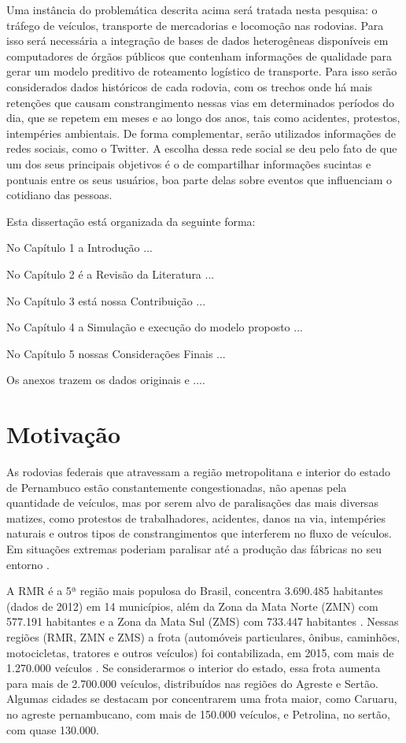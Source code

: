 Uma instância do problemática descrita acima será tratada nesta pesquisa: o tráfego de veículos, transporte de mercadorias e locomoção nas rodovias.  Para isso será necessária a integração de bases de dados heterogêneas disponíveis em computadores de órgãos públicos 
que contenham informações de qualidade para gerar um modelo preditivo de roteamento logístico de transporte. Para isso serão considerados dados históricos de cada rodovia, com os trechos onde há mais 
retenções que causam constrangimento nessas vias em determinados períodos do dia, que se repetem em meses e ao longo dos anos, tais como acidentes, protestos, intempéries ambientais.
De forma complementar, serão utilizados informações de redes sociais, como o Twitter. A escolha dessa rede social se deu pelo fato de que um dos seus principais objetivos é o de compartilhar informações sucintas e pontuais entre os seus usuários, boa parte delas sobre eventos que influenciam o cotidiano das pessoas.

Esta dissertação está organizada da seguinte forma:

No Capítulo 1 a Introdução ...

No Capítulo 2 é a Revisão da Literatura ...

No Capítulo 3 está nossa Contribuição ...

No Capítulo 4 a Simulação e execução do modelo proposto ...

No Capítulo 5 nossas Considerações Finais ...

Os anexos trazem os dados originais e ....


\section{ Motivação}\label{intro:motivacao}

As rodovias federais que atravessam a região metropolitana e interior do estado de Pernambuco estão constantemente congestionadas, não apenas pela 
quantidade de veículos, mas por serem alvo de paralisações das mais diversas matizes, como protestos de trabalhadores, acidentes, danos na via, intempéries naturais e outros tipos de constrangimentos que interferem no fluxo de veículos. 
Em situações extremas poderiam paralisar até a produção das fábricas no seu entorno \cite{BNDES2013}. 

A RMR é a 5ª região mais populosa do Brasil, concentra 3.690.485 habitantes (dados de 2012) em 14 municípios, além da 
Zona da Mata Norte (ZMN) com 577.191 habitantes e a Zona da Mata Sul (ZMS) com 733.447 habitantes \cite{Bitoun2012}. 
Nessas regiões (RMR, ZMN e ZMS) a frota (automóveis particulares, ônibus, caminhões, motocicletas, tratores e outros veículos) 
foi contabilizada, em 2015, com mais de 1.270.000 veículos \cite{FrotaVeiculosIBGE}. Se considerarmos o interior do estado, essa frota aumenta para mais de 2.700.000 veículos, distribuídos nas regiões do Agreste e Sertão. Algumas cidades se destacam por concentrarem uma frota maior, como Caruaru, no agreste pernambucano, com mais de 150.000 veículos, e Petrolina, no sertão, com quase 130.000. 
																			
